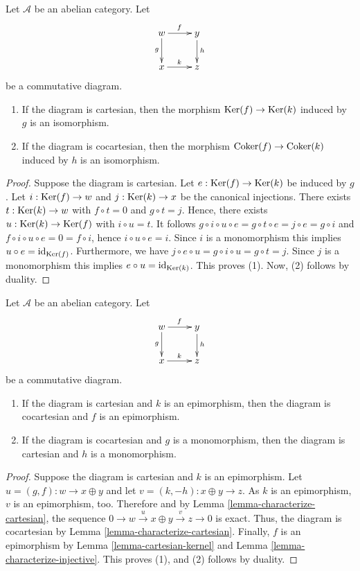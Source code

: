 \begin{lemma}
\label{lemma-cartesian-kernel}
Let $\mathcal{A}$ be an abelian category. Let
$$
\xymatrix{
w\ar[r]^f\ar[d]_g
& y\ar[d]^h\\
x\ar[r]^k
& z
}
$$
be a commutative diagram.
\begin{enumerate}
\item If the diagram is cartesian, then the
morphism
$\mathop{\mathrm{Ker}}(f)\to\mathop{\mathrm{Ker}}(k)$ induced by $g$ is an
isomorphism.
\item If the diagram is cocartesian, then the
morphism
$\mathop{\mathrm{Coker}}(f)\to\mathop{\mathrm{Coker}}(k)$ induced by $h$ is an
isomorphism.
\end{enumerate}
\end{lemma}

\begin{proof}
Suppose the diagram is cartesian. Let
$e:\mathop{\mathrm{Ker}}(f)\to\mathop{\mathrm{Ker}}(k)$ be induced by $g$. Let
$i:\mathop{\mathrm{Ker}}(f)\to w$ and $j:\mathop{\mathrm{Ker}}(k)\to x$ be the
canonical
injections. There exists $t:\mathop{\mathrm{Ker}}(k)\to w$
with $f\circ t=0$
and $g\circ t=j$. Hence, there exists
$u:\mathop{\mathrm{Ker}}(k)\to\mathop{\mathrm{Ker}}(f)$
with $i\circ u=t$. It follows
$g\circ i\circ u\circ e=g\circ t\circ
e=j\circ e=g\circ i$ and
$f\circ i\circ u\circ e=0=f\circ i$, hence
$i\circ u\circ e=i$. Since
$i$ is a monomorphism this implies $u\circ
e=\text{id}_{\mathop{\mathrm{Ker}}(f)}$.
Furthermore, we have $j\circ e\circ u=g\circ
i\circ u=g\circ t=j$.
Since $j$ is a monomorphism this implies
$e\circ u=\text{id}_{\mathop{\mathrm{Ker}}(k)}$.
This proves (1). Now, (2) follows by duality.
\end{proof}

\begin{lemma}
\label{lemma-cartesian-cocartesian}
Let $\mathcal{A}$ be an abelian category. Let
$$
\xymatrix{
w\ar[r]^f\ar[d]_g
& y\ar[d]^h\\
x\ar[r]^k
& z
}
$$
be a commutative diagram.
\begin{enumerate}
\item If the diagram is cartesian and $k$ is
an epimorphism,
then the diagram is cocartesian and $f$ is an
epimorphism.
\item If the diagram is cocartesian and $g$
is a monomorphism,
then the diagram is cartesian and $h$ is a
monomorphism.
\end{enumerate}
\end{lemma}

\begin{proof}
Suppose the diagram is cartesian and $k$ is
an epimorphism.
Let $u = (g, f) : w \to x \oplus y$ and let
$v = (k, -h) : x \oplus y \to z$.
As $k$ is an epimorphism, $v$ is an
epimorphism, too. Therefore
and by Lemma
\ref{lemma-characterize-cartesian}, the
sequence
$0\to w\overset{u}\to x\oplus y\overset{v}\to
z\to 0$ is exact. Thus, the
diagram is cocartesian by Lemma
\ref{lemma-characterize-cartesian}. Finally,
$f$ is an epimorphism by Lemma
\ref{lemma-cartesian-kernel} and
Lemma \ref{lemma-characterize-injective}.
This proves (1), and (2)
follows by duality.
\end{proof}

